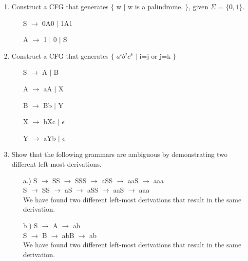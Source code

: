 \documentclass[12pt]{article}
\begin{document}
\begin{enumerate}
	\item Construct a CFG that generates  $\{$ w $|$ w is a palindrome. $\}$, given $\Sigma$ = $\{0,1\}$. 
	\begin{itemize}
		\item[] S $\rightarrow$ 0A0 $|$ 1A1
		\item[] A $\rightarrow$ 1 $|$ 0 $|$ S \\
	\end{itemize}
	
	\item Construct a CFG that generates $\{$ $a^ib^jc^k$ $|$ i=j or j=k $\}$
	\begin{itemize}
		\item[] S $\rightarrow$ A $|$ B
		\item[] A $\rightarrow$ aA $|$ X
		\item[] B $\rightarrow$ Bb $|$ Y
		\item[] X $\rightarrow$ bXc $|$ $\epsilon$
		\item[] Y $\rightarrow$ aYb $|$ $\epsilon$
	\end{itemize}
	
	\item Show that the following grammars are ambiguous by demonstrating two different left-most derivations.
	\begin{itemize}
		\item[a.)] S $\rightarrow$ SS $\rightarrow$ SSS $\rightarrow$ aSS $\rightarrow$ aaS $\rightarrow$ aaa \\
		S $\rightarrow$ SS $\rightarrow$ aS $\rightarrow$ aSS $\rightarrow$ aaS $\rightarrow$ aaa \\
		We have found two different left-most derivations that result in the same derivation. \\
		\item[b.)] S $\rightarrow$ A $\rightarrow$ ab \\
		S $\rightarrow$ B $\rightarrow$ abB $\rightarrow$ ab \\
		We have found two different left-most derivations that result in the same derivation. 
	\end{itemize}
	

\end{enumerate}
\end{document}
